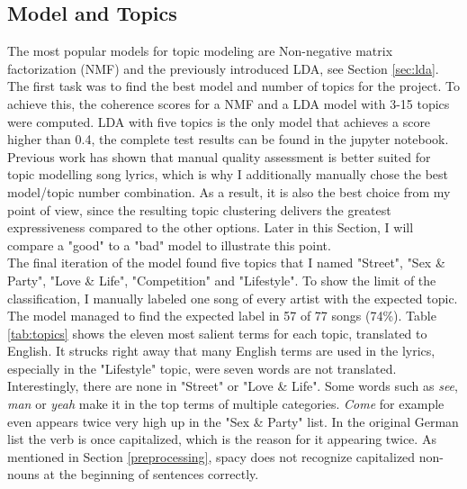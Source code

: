 \documentclass[conference]{IEEEtran}
\begin{document}
\subsection{Model and Topics}
The most popular models for topic modeling are Non-negative matrix factorization (NMF) and the previously introduced LDA, see Section \ref{sec:lda}. The first task was to find the best model and number of topics for the project. To achieve this, the coherence scores for a NMF and a LDA model with 3-15 topics were computed. LDA with five topics is the only model that achieves a score higher than 0.4, the complete test results can be found in the jupyter notebook. Previous work has shown \cite{sterckx} that manual quality assessment is better suited for topic modelling song lyrics, which is why I additionally manually chose the best model/topic number combination. As a result, it is also the best choice from my point of view, since the resulting topic clustering delivers the greatest expressiveness compared to the other options. Later in this Section, I will compare a "good" to a "bad" model to illustrate this point.\\
The final iteration of the model found five topics that I named "Street", "Sex \& Party", "Love \& Life", "Competition" and "Lifestyle". To show the limit of the classification, I manually labeled one song of every artist with the expected topic. The model managed to find the expected label in 57 of 77 songs (74\%). Table \ref{tab:topics} shows the eleven most salient terms for each topic, translated to English. It strucks right away that many English terms are used in the lyrics, especially in the "Lifestyle" topic, were seven words are not translated. Interestingly, there are none in "Street" or "Love \& Life". Some words such as \textit{see}, \textit{man} or \textit{yeah} make it in the top terms of multiple categories. \textit{Come} for example even appears twice very high up in the "Sex \& Party" list. In the original German list the verb is once capitalized, which is the reason for it appearing twice. As mentioned in Section \ref{preprocessing}, spacy does not recognize capitalized non-nouns at the beginning of sentences correctly.
\end{document}
